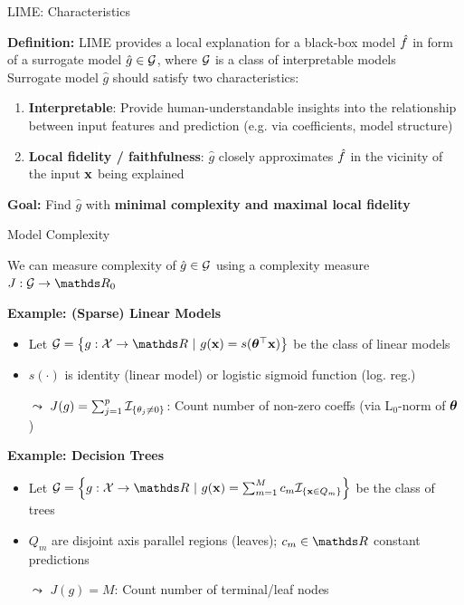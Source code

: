 \documentclass[10pt,compress,t,notes=noshow, xcolor=table]{beamer}
\newcommand{\gh}{\hat{g}}
\begin{document}
\begin{frame}{LIME: Characteristics}

    \textbf{Definition:}
	LIME provides a local explanation for a black-box model $\hat{f}$ in form of a surrogate model $\gh \in \Gspace$, where $\mathcal{G}$ is a class of interpretable models\\[2em]
	
	
	Surrogate model $\gh$ should satisfy two characteristics:
	\begin{enumerate}
		\item \textbf{Interpretable}: Provide human-understandable insights into the relationship between input features and prediction (e.g. via coefficients, model structure)
	\item \textbf{Local fidelity / faithfulness}: 
    $\gh$ closely approximates $\hat{f}$ in the vicinity of the input $\mathbf{x}$ being explained
	\end{enumerate}
	
	\vspace{2em}
	\textbf{Goal:} Find $\gh$ with \textbf{minimal complexity and maximal local fidelity} 
\end{frame}


\begin{frame}{Model Complexity}
    
    We can measure complexity of $\gh \in \Gspace$ using a complexity measure $J: \mathcal{G} \to \R_{0}$ \lz %

 	\textbf{Example: (Sparse) Linear Models}\\
 	\begin{itemize}
 	    \item Let $\Gspace = \left\{g: \Xspace \to \R ~|~g(\xv) = s(\thetav^\top \xv)\right\}$ be the class of linear models
 	    \item $s(\cdot)$ is identity (linear model) or logistic sigmoid function  (log. reg.)
 	    \item[$\leadsto$] $J(g) = \sum_{j = 1}^p \mathcal{I}_{\{ \theta_j \neq 0 \}}$: Count number of non-zero coeffs (via L$_0$-norm of $\bm{\theta}$)
 	\end{itemize}
 	\lz\pause
 	
 	\textbf{Example: Decision Trees}\\
 	\begin{itemize}
 	    \item Let $\Gspace = \left\{g:\Xspace \to \R ~|~g(\xv) = \sum_{m=1}^M c_m \ind_{\{ \xv \in Q_m \}}\right\}$ be the class of trees
        \item $Q_m$ are disjoint axis parallel regions (leaves); $c_m \in \R$ constant predictions
 	    \item[$\leadsto$] $J(g) = M$: Count number of terminal/leaf nodes
 	\end{itemize}
 	
\end{frame}
 
\end{document}

